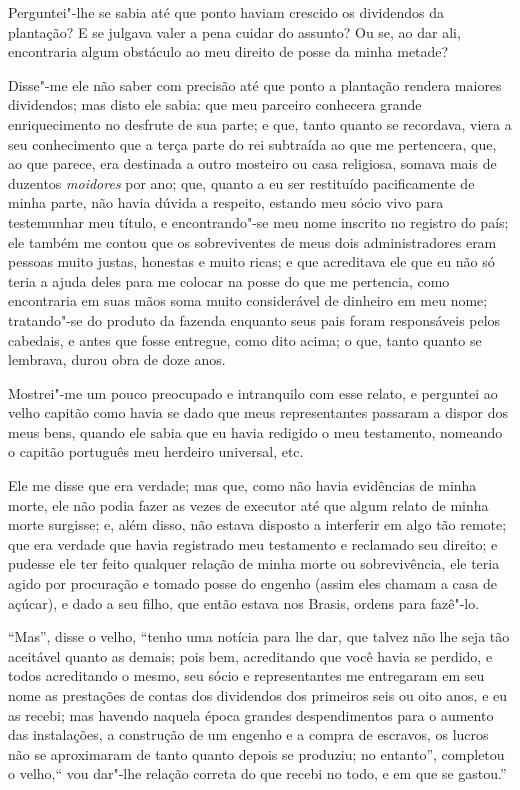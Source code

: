 Perguntei"-lhe se sabia até que ponto haviam crescido os dividendos da
plantação? E se julgava valer a pena cuidar do assunto? Ou se, ao dar
ali, encontraria algum obstáculo ao meu direito de posse da minha
metade?

Disse"-me ele não saber com precisão até que ponto a plantação rendera
maiores dividendos; mas disto ele sabia: que meu parceiro conhecera
grande enriquecimento no desfrute de sua parte; e que, tanto quanto se
recordava, viera a seu conhecimento que a terça parte do rei subtraída
ao que me pertencera, que, ao que parece, era destinada a outro mosteiro
ou casa religiosa, somava mais de duzentos \emph{moidores} por ano; que,
quanto a eu ser restituído pacificamente de minha parte, não havia
dúvida a respeito, estando meu sócio vivo para testemunhar meu título, e
encontrando"-se meu nome inscrito no registro do país; ele também me
contou que os sobreviventes de meus dois administradores eram pessoas
muito justas, honestas e muito ricas; e que acreditava ele que eu não só
teria a ajuda deles para me colocar na posse do que me pertencia, como
encontraria em suas mãos soma muito considerável de dinheiro em meu
nome; tratando"-se do produto da fazenda enquanto seus pais foram
responsáveis pelos cabedais, e antes que fosse entregue, como dito
acima; o que, tanto quanto se lembrava, durou obra de doze anos.

Mostrei"-me um pouco preocupado e intranquilo com esse relato, e
perguntei ao velho capitão como havia se dado que meus representantes
passaram a dispor dos meus bens, quando ele sabia que eu havia redigido
o meu testamento, nomeando o capitão português meu herdeiro universal,
etc.

Ele me disse que era verdade; mas que, como não havia evidências de
minha morte, ele não podia fazer as vezes de executor até que algum
relato de minha morte surgisse; e, além disso, não estava disposto a
interferir em algo tão remote; que era verdade que havia registrado meu
testamento e reclamado seu direito; e pudesse ele ter feito qualquer
relação de minha morte ou sobrevivência, ele teria agido por procuração
e tomado posse do engenho (assim eles chamam a casa de açúcar), e dado a
seu filho, que então estava nos Brasis, ordens para fazê"-lo.

``Mas'', disse o velho, ``tenho uma notícia para lhe dar, que talvez não
lhe seja tão aceitável quanto as demais; pois bem, acreditando que você
havia se perdido, e todos acreditando o mesmo, seu sócio e
representantes me entregaram em seu nome as prestações de contas dos
dividendos dos primeiros seis ou oito anos, e eu as recebi; mas havendo
naquela época grandes despendimentos para o aumento das instalações, a
construção de um engenho e a compra de escravos, os lucros não se
aproximaram de tanto quanto depois se produziu; no entanto'', completou
o velho,`` vou dar"-lhe relação correta do que recebi no todo, e em que
se gastou.''

